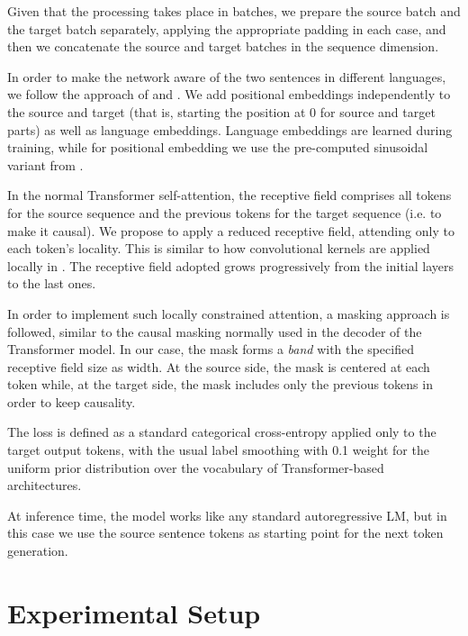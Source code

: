 \documentclass[11pt,a4paper]{article}
\begin{document}
Given that the processing takes place in batches, we
prepare the source batch and the target batch separately,
applying the appropriate padding in each case,
and then we concatenate the source and target batches in
the sequence dimension.

In order to make the network aware of the two sentences in different languages, 
we follow the approach of \cite{he2018layerwise} and \cite{lample2019cross}.
We add positional embeddings independently to the source and target
(that is, starting the position at $0$ for source and target parts)
as well as language embeddings. Language embeddings are learned 
during training, while for positional embedding we use the
pre-computed sinusoidal variant from \cite{vaswani2017transformer}.

In the normal Transformer self-attention, the receptive field
comprises all tokens for the source sequence and the previous
tokens for the target sequence (i.e. to make it causal).
We propose to apply a reduced receptive field, attending only
to each token's locality.
This is similar to how convolutional kernels are applied
locally in \cite{wu2018dynconv}. The receptive field adopted
grows progressively from the initial layers to the last ones.

In order to implement such locally constrained attention, a
masking approach is followed, similar to the causal masking
normally used in the decoder of the Transformer model. In our
case, the mask forms a \textit{band}
with the specified receptive field size as width. At the source
side, the mask is centered at each token while, at the target
side, the mask includes only the previous tokens in order
to keep causality.

The loss is defined as a standard categorical cross-entropy
applied only to the target output tokens, with the usual label 
smoothing with 0.1 weight for the uniform prior distribution over the vocabulary
of Transformer-based architectures.

At inference time, the model works like any standard autoregressive LM,
but in this case we use the source sentence tokens as starting
point for the next token generation.

\section{Experimental Setup} \label{sec:experiments}
\end{document}
